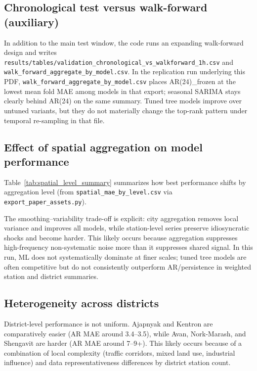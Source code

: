 \documentclass[11pt,a4paper]{article}
\begin{document}
\subsection{Chronological test versus walk-forward (auxiliary)}

In addition to the main test window, the code runs an expanding walk-forward design and writes \texttt{results/tables/validation\_chronological\_vs\_walkforward\_1h.csv} and \texttt{walk\_forward\_aggregate\_by\_model.csv}. In the replication run underlying this PDF, \texttt{walk\_forward\_aggregate\_by\_model.csv} places AR(24)\_frozen at the lowest mean fold MAE among models in that export; seasonal SARIMA stays clearly behind AR(24) on the same summary. Tuned tree models improve over untuned variants, but they do not materially change the top-rank pattern under temporal re-sampling in that file.

\subsection{Effect of spatial aggregation on model performance}

Table~\ref{tab:spatial_level_summary} summarizes how best performance shifts by aggregation level (from \texttt{spatial\_mae\_by\_level.csv} via \texttt{export\_paper\_assets.py}).



The smoothing--variability trade-off is explicit: city aggregation removes local variance and improves all models, while station-level series preserve idiosyncratic shocks and become harder. This likely occurs because aggregation suppresses high-frequency non-systematic noise more than it suppresses shared signal. In this run, ML does not systematically dominate at finer scales; tuned tree models are often competitive but do not consistently outperform AR/persistence in weighted station and district summaries.

\subsection{Heterogeneity across districts}

District-level performance is not uniform. Ajapnyak and Kentron are comparatively easier (AR MAE around 3.4--3.5), while Avan, Nork-Marash, and Shengavit are harder (AR MAE around 7--9+). This likely occurs because of a combination of local complexity (traffic corridors, mixed land use, industrial influence) and data representativeness differences by district station count.
\end{document}
